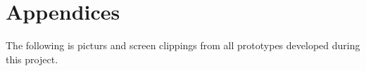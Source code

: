 \chapter{Appendices}

The following is picturs and screen clippings from all prototypes developed during this project.





